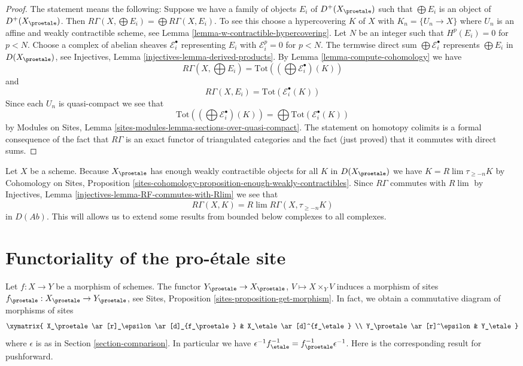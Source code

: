 \begin{proof}
The statement means the following: Suppose we have a family of objects
$E_i$ of $D^+(X_\proetale)$ such that $\bigoplus E_i$ is an object
of $D^+(X_\proetale)$. Then
$R\Gamma(X, \bigoplus E_i) = \bigoplus R\Gamma(X, E_i)$.
To see this choose a hypercovering $K$ of $X$ with $K_n = \{U_n \to X\}$
where $U_n$ is an affine and weakly contractible scheme, see
Lemma \ref{lemma-w-contractible-hypercovering}.
Let $N$ be an integer such that $H^p(E_i) = 0$ for $p < N$.
Choose a complex of abelian sheaves $\mathcal{E}_i^\bullet$
representing $E_i$ with $\mathcal{E}_i^p = 0$ for $p < N$.
The termwise direct sum $\bigoplus \mathcal{E}_i^\bullet$ represents
$\bigoplus E_i$ in $D(X_\proetale)$, see
Injectives, Lemma \ref{injectives-lemma-derived-products}.
By Lemma \ref{lemma-compute-cohomology} we have
$$
R\Gamma(X, \bigoplus E_i) =
\text{Tot}((\bigoplus \mathcal{E}^\bullet_i)(K))
$$
and
$$
R\Gamma(X, E_i) = \text{Tot}(\mathcal{E}^\bullet_i(K))
$$
Since each $U_n$ is quasi-compact we see that
$$
\text{Tot}((\bigoplus \mathcal{E}^\bullet_i)(K)) =
\bigoplus \text{Tot}(\mathcal{E}^\bullet_i(K))
$$
by Modules on Sites, Lemma
\ref{sites-modules-lemma-sections-over-quasi-compact}.
The statement on homotopy colimits is a formal consequence of the fact
that $R\Gamma$ is an exact functor of triangulated categories and the
fact (just proved) that it commutes with direct sums.
\end{proof}

\begin{remark}
\label{remark-extend-to-all}
Let $X$ be a scheme. Because $X_\proetale$ has enough weakly contractible
objects for all $K$ in $D(X_\proetale)$ we have $K = R\lim \tau_{\geq -n}K$
by
Cohomology on Sites, Proposition
\ref{sites-cohomology-proposition-enough-weakly-contractibles}.
Since $R\Gamma$ commutes with $R\lim$ by
Injectives, Lemma \ref{injectives-lemma-RF-commutes-with-Rlim}
we see that
$$
R\Gamma(X, K) = R\lim R\Gamma(X, \tau_{\geq -n}K)
$$
in $D(\textit{Ab})$. This will allows us to extend some results from
bounded below complexes to all complexes.
\end{remark}





\section{Functoriality of the pro-\'etale site}
\label{section-morphism}

\noindent
Let $f : X \to Y$ be a morphism of schemes. The functor
$Y_\proetale \to X_\proetale$, $V \mapsto X \times_Y V$
induces a morphism of sites $f_\proetale : X_\proetale \to Y_\proetale$, see
Sites, Proposition \ref{sites-proposition-get-morphism}.
In fact, we obtain a commutative diagram of morphisms of sites
$$
\xymatrix{
X_\proetale \ar[r]_\epsilon \ar[d]_{f_\proetale} &
X_\etale \ar[d]^{f_\etale} \\
Y_\proetale \ar[r]^\epsilon & Y_\etale
}
$$
where $\epsilon$ is as in Section \ref{section-comparison}.
In particular we have
$\epsilon^{-1} f_\etale^{-1} = f_\proetale^{-1} \epsilon^{-1}$.
Here is the corresponding result for pushforward.

